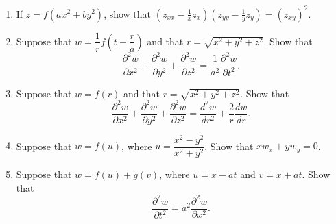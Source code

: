 \documentclass[titlepage,a4paper,12pt]{report}
\begin{document}
\begin{enumerate}
 \item If $z=f(ax^2+by^2)$, show that $(z_{xx}-\frac{1}{x}z_x)(z_{yy}-\frac{1}{y}z_y)=(z_{xy})^2$.
  \item Suppose that $w=\dfrac{1}{r}f\left(t-\dfrac{r}{a}\right)$ and that $r=\sqrt{x^2+y^2+z^2}$. Show that \[\dfrac{\partial ^2 w}{\partial x^2}+\dfrac{\partial ^2 w}{\partial y^2}+\dfrac{\partial ^2 w}{\partial z^2}=\dfrac{1}{a^2}\dfrac{\partial ^2w}{\partial t^2}.\]
  \item Suppose that $w=f(r)$ and that $r=\sqrt{x^2+y^2+z^2}$. Show that \[\dfrac{\partial ^2 w}{\partial x^2}+\dfrac{\partial ^2 w}{\partial y^2}+\dfrac{\partial ^2 w}{\partial z^2}=\dfrac{d^2 w}{dr^2}+\dfrac{2}{r}\dfrac{dw}{dr}.\]
  \item Suppose that $w=f(u)$, where $u=\dfrac{x^2-y^2}{x^2+y^2}$. Show that $xw_x+yw_y=0$.
  \item Suppose that $w=f(u)+g(v)$, where $u=x-at$ and $v=x+at$. Show that 
  \[\dfrac{\partial ^2w }{\partial t^2}=a^2\dfrac{\partial ^2 w}{\partial x^2}.\]
 \end{enumerate}
 
\end{document}
